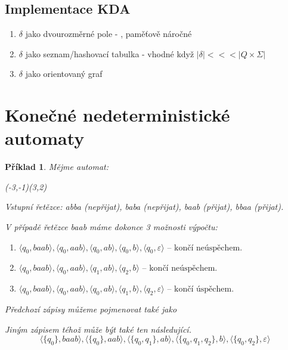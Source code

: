 \documentclass[10pt, a4paper, titlepage]{article}
\theoremstyle{note}
\newtheorem{priklad}{Příklad}
\begin{document}
\subsection{Implementace KDA}
\begin{enumerate}
\item $\delta$ jako dvourozměrné pole - , paměťově náročné
\item $\delta$ jako seznam/hashovací tabulka - vhodné když $|\delta | <<< |Q\times \Sigma |$
\item $\delta$ jako orientovaný graf
\end{enumerate}


\section{Konečné nedeterministické automaty}

\begin{priklad}
Mějme automat:

\vspace*{40px}
\begin{center}
\begin{VCPicture}{(-3,-1)(3,2)}

\end{VCPicture}
\end{center}

Vstupní řetězce: \textit{abba} (nepřijat), \textit{baba} (nepřijat), \textit{baab} (přijat), \textit{bbaa} (přijat).

V případě řetězce \textit{baab} máme dokonce 3 možnosti výpočtu:
\begin{enumerate}
\item
$\langle q_{0}, baab \rangle, \langle q_{0}, aab \rangle, \langle q_{0}, ab \rangle, \langle q_{0}, b \rangle, \langle q_{0}, \varepsilon \rangle \text{ -- končí neúspěchem.}$
\item
$\langle q_{0}, baab \rangle, \langle q_{0}, aab \rangle, \langle q_{1}, ab \rangle, \langle q_{2}, b \rangle \text{ -- končí neúspěchem.}$
\item
$\langle q_{0}, baab \rangle, \langle q_{0}, aab \rangle, \langle q_{0}, ab \rangle, \langle q_{1}, b \rangle, \langle q_{2}, \varepsilon \rangle \text{ -- končí úspěchem.}$ 
\end{enumerate}
Předchozí zápisy můžeme pojmenovat také jako 

Jiným zápisem téhož může být také ten následující.
$$
\langle \lbrace q_{0} \rbrace, baab \rangle, \langle \lbrace q_{0} \rbrace, aab \rangle, \langle \lbrace q_{0}, q_{1} \rbrace, ab \rangle,
\langle \lbrace q_{0}, q_{1}, q_{2} \rbrace, b \rangle, \langle \lbrace q_{0}, q_{2} \rbrace, \varepsilon \rangle
$$ 
\end{priklad}
\end{document}
